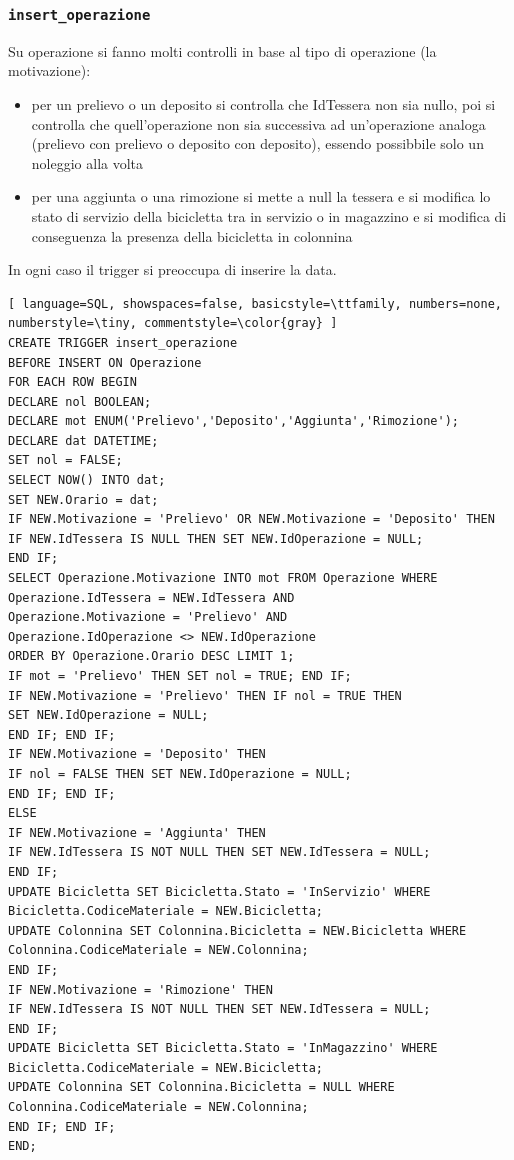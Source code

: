 \documentclass[a4paper,twoside]{article}
\begin{document}
\subsubsection{\texttt{insert\_operazione}}
Su operazione si fanno molti controlli in base al tipo di operazione (la motivazione):
\begin{itemize}
 \item per un prelievo o un deposito si controlla che IdTessera non sia nullo, poi si controlla che quell'operazione non sia successiva ad un'operazione analoga (prelievo con prelievo o deposito con deposito), essendo possibbile solo un noleggio alla volta
 \item per una aggiunta o una rimozione si mette a null la tessera e si modifica lo stato di servizio della bicicletta tra in servizio o in magazzino e si modifica di conseguenza la presenza della bicicletta in colonnina
\end{itemize}
In ogni caso il trigger si preoccupa di inserire la data.
\begin{lstlisting}[ language=SQL, showspaces=false, basicstyle=\ttfamily, numbers=none, numberstyle=\tiny, commentstyle=\color{gray} ]
CREATE TRIGGER insert_operazione
BEFORE INSERT ON Operazione
FOR EACH ROW BEGIN
DECLARE nol BOOLEAN;
DECLARE mot ENUM('Prelievo','Deposito','Aggiunta','Rimozione');
DECLARE dat DATETIME;
SET nol = FALSE;
SELECT NOW() INTO dat;
SET NEW.Orario = dat;
IF NEW.Motivazione = 'Prelievo' OR NEW.Motivazione = 'Deposito' THEN
IF NEW.IdTessera IS NULL THEN SET NEW.IdOperazione = NULL;
END IF;
SELECT Operazione.Motivazione INTO mot FROM Operazione WHERE
Operazione.IdTessera = NEW.IdTessera AND
Operazione.Motivazione = 'Prelievo' AND
Operazione.IdOperazione <> NEW.IdOperazione
ORDER BY Operazione.Orario DESC LIMIT 1;
IF mot = 'Prelievo' THEN SET nol = TRUE; END IF;
IF NEW.Motivazione = 'Prelievo' THEN IF nol = TRUE THEN
SET NEW.IdOperazione = NULL;
END IF; END IF;
IF NEW.Motivazione = 'Deposito' THEN
IF nol = FALSE THEN SET NEW.IdOperazione = NULL;
END IF; END IF;
ELSE
IF NEW.Motivazione = 'Aggiunta' THEN
IF NEW.IdTessera IS NOT NULL THEN SET NEW.IdTessera = NULL;
END IF;
UPDATE Bicicletta SET Bicicletta.Stato = 'InServizio' WHERE
Bicicletta.CodiceMateriale = NEW.Bicicletta;
UPDATE Colonnina SET Colonnina.Bicicletta = NEW.Bicicletta WHERE
Colonnina.CodiceMateriale = NEW.Colonnina;
END IF;
IF NEW.Motivazione = 'Rimozione' THEN
IF NEW.IdTessera IS NOT NULL THEN SET NEW.IdTessera = NULL;
END IF;
UPDATE Bicicletta SET Bicicletta.Stato = 'InMagazzino' WHERE
Bicicletta.CodiceMateriale = NEW.Bicicletta;
UPDATE Colonnina SET Colonnina.Bicicletta = NULL WHERE
Colonnina.CodiceMateriale = NEW.Colonnina;
END IF; END IF;
END;
\end{lstlisting}
\end{document}
